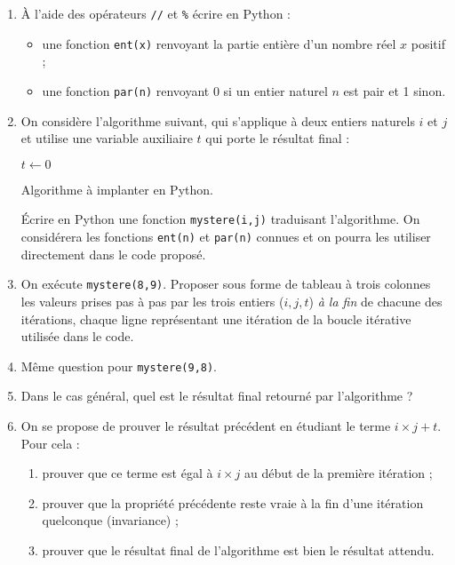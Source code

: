 \begin{enumerate}
 \item À l'aide des opérateurs \verb|//| et \verb|%| écrire en Python :
 \begin{itemize}
 \item une fonction \texttt{ent(x)} renvoyant la partie entière d'un nombre réel $x$ positif ;
  
 \item une fonction \texttt{par(n)} renvoyant 0 si un entier naturel $n$ est pair et 1 sinon.
 \end{itemize}
 
 \item On considère l’algorithme suivant, qui s'applique à deux entiers naturels $i$ et $j$ et utilise une variable auxiliaire $t$ qui porte le résultat final :


\begin{algorithm}[H]
$t \leftarrow 0$\\
\caption{Algorithme à implanter en Python.}
\label{algo:1}
\end{algorithm}

Écrire en Python une fonction \texttt{mystere(i,j)} traduisant l'algorithme. On considérera les fonctions \texttt{ent(n)} et \texttt{par(n)} connues et on pourra les utiliser directement dans le code proposé.

    \item On exécute \texttt{mystere(8,9)}. Proposer sous forme de tableau à trois colonnes les valeurs prises pas à pas par les trois entiers ($i,j,t$) \textit{à la fin} de chacune des itérations, chaque ligne représentant une itération de la boucle itérative utilisée dans le code.

    \item Même question pour \texttt{mystere(9,8)}.

    \item Dans le cas général, quel est le résultat final retourné par l'algorithme ?

    \item On se propose de prouver le résultat précédent en étudiant le terme $i\times j+t$. Pour cela : 
\begin{enumerate}
    \item prouver que ce terme est égal à $i\times j$ au début de la première itération ;
    
    \item prouver que la propriété précédente reste vraie à la fin d'une itération quelconque (invariance) ;
    
    \item prouver que le résultat final de l'algorithme est bien le résultat attendu.
\end{enumerate}


\end{enumerate}


